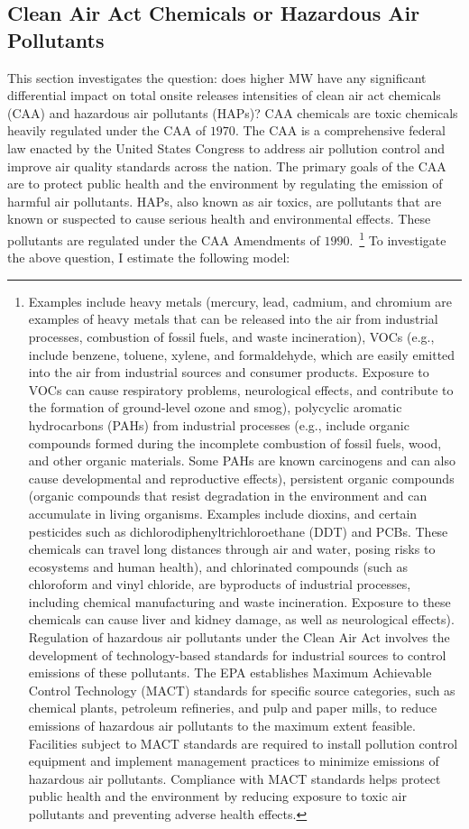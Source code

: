 \documentclass[12pt, english]{article}
\begin{document}
    \subsection{Clean Air Act Chemicals or Hazardous Air Pollutants}\label{subsec:clean-air-act-chemicals-haps}
    This section investigates the question: does higher MW have any significant differential impact on total onsite releases intensities of clean air act chemicals (CAA) and hazardous air pollutants (HAPs)? CAA chemicals are toxic chemicals heavily regulated under the CAA of $1970$. The CAA is a comprehensive federal law enacted by the United States Congress to address air pollution control and improve air quality standards across the nation. The primary goals of the CAA are to protect public health and the environment by regulating the emission of harmful air pollutants. HAPs, also known as air toxics, are pollutants that are known or suspected to cause serious health and environmental effects. These pollutants are regulated under the CAA Amendments of $1990$.~\footnote{\tiny  Examples include heavy metals (mercury, lead, cadmium, and chromium are examples of heavy metals that can be released into the air from industrial processes, combustion of fossil fuels, and waste incineration), VOCs (e.g., include benzene, toluene, xylene, and formaldehyde, which are easily emitted into the air from industrial sources and consumer products. Exposure to VOCs can cause respiratory problems, neurological effects, and contribute to the formation of ground-level ozone and smog), polycyclic aromatic hydrocarbons (PAHs) from industrial processes (e.g., include organic compounds formed during the incomplete combustion of fossil fuels, wood, and other organic materials. Some PAHs are known carcinogens and can also cause developmental and reproductive effects), persistent organic compounds (organic compounds that resist degradation in the environment and can accumulate in living organisms. Examples include dioxins, and certain pesticides such as dichlorodiphenyltrichloroethane (DDT) and PCBs. These chemicals can travel long distances through air and water, posing risks to ecosystems and human health), and chlorinated compounds (such as chloroform and vinyl chloride, are byproducts of industrial processes, including chemical manufacturing and waste incineration. Exposure to these chemicals can cause liver and kidney damage, as well as neurological effects). Regulation of hazardous air pollutants under the Clean Air Act involves the development of technology-based standards for industrial sources to control emissions of these pollutants. The EPA establishes Maximum Achievable Control Technology (MACT) standards for specific source categories, such as chemical plants, petroleum refineries, and pulp and paper mills, to reduce emissions of hazardous air pollutants to the maximum extent feasible. Facilities subject to MACT standards are required to install pollution control equipment and implement management practices to minimize emissions of hazardous air pollutants. Compliance with MACT standards helps protect public health and the environment by reducing exposure to toxic air pollutants and preventing adverse health effects.} To investigate the above question, I estimate the following model:
\end{document}
